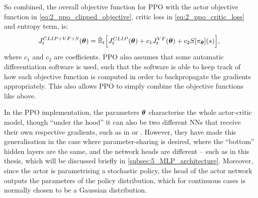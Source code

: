 So combined, the overall objective function for PPO with the actor objective function in \eqref{eq:2_ppo_clipped_objective}, critic loss in \eqref{eq:2_ppo_critic_loss} and entropy term, is:
\begin{equation}
    J_t^{CLIP+VF+S}(\boldsymbol{\theta}) = \hat{\mathbb{E}}_t \Big[
    J_t^{CLIP}(\boldsymbol{\theta}) + c_1 J_t^{VF}(\boldsymbol{\theta}) + c_2 S[\pi_{\boldsymbol{\theta}}](s)
    \Big],   \label{eq:2_ppo_full_objective}
\end{equation}
where $c_1$ and $c_2$ are coefficients. PPO also assumes that some automatic differentiation software is used, such that the software is able to keep track of how each objective function is computed in order to backpropagate the gradients appropriately. This also allows PPO to simply combine the objective functions like above.

In the PPO implementation, the parameters $\boldsymbol{\theta}$ characterise the whole actor-critic model, though ``under the hood'' it can also be two different NNs that receive their own respective gradients, such as in \cite{LearningWalkMassivelyParallel} or \cite{AMPMotionPriors}. However, they have made this generalisation in the case where parameter-sharing is desired, where the ``bottom'' hidden layers are the same, and the network heads are different -- such as in this thesis, which will be discussed briefly in \cref{subsec:5_MLP_architecture}. Moreover, since the actor is parametrising a stochastic policy, the head of the actor network outputs the parameters of the policy distribution, which for continuous cases is normally chosen to be a Gaussian distribution.

